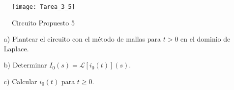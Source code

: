 \documentclass[
  11pt,
  letterpaper,
   addpoints,
  ]{exam}
\begin{document}
\begin{questions}
\begin{figure}[h!]
    \centering
    \texttt{[image: Tarea\_3\_5]}
    \caption{Circuito Propuesto 5}
    \label{fig:circuito5}
\end{figure}

\begin{enumerate}
    \item[a)] Plantear el circuito con el método de mallas para $t > 0$ en el dominio de Laplace.
    \item[b)] Determinar $I_0(s) = \mathcal{L}[i_0(t)](s)$.
    \item[c)] Calcular $i_0(t)$ para $t \geq 0$.
\end{enumerate}

\end{questions}
\end{document}
